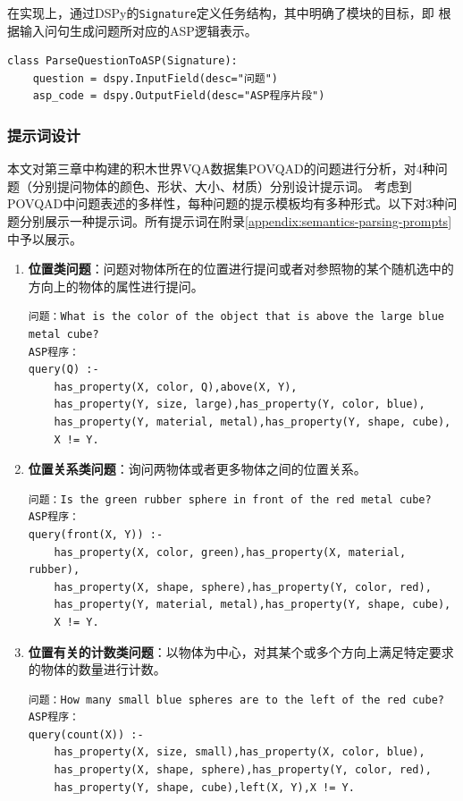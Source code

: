 在实现上，通过DSPy的\texttt{Signature}定义任务结构，其中明确了模块的目标，即
根据输入问句生成问题所对应的ASP逻辑表示。
\begin{lstlisting}
class ParseQuestionToASP(Signature):
    question = dspy.InputField(desc="问题")
    asp_code = dspy.OutputField(desc="ASP程序片段")
\end{lstlisting}
\subsubsection{提示词设计}
本文对第三章中构建的积木世界VQA数据集POVQAD的问题进行分析，对4种问题（分别提问物体的颜色、形状、大小、材质）分别设计提示词。
考虑到POVQAD中问题表述的多样性，每种问题的提示模板均有多种形式。以下对3种问题分别展示一种提示词。所有提示词在附录\ref{appendix:semantics-parsing-prompts}中予以展示。
\begin{enumerate}[nosep]
\item \textbf{位置类问题}：问题对物体所在的位置进行提问或者对参照物的某个随机选中的方向上的物体的属性进行提问。
\begin{lstlisting}
问题：What is the color of the object that is above the large blue metal cube?
ASP程序：
query(Q) :-
    has_property(X, color, Q),above(X, Y),
    has_property(Y, size, large),has_property(Y, color, blue),
    has_property(Y, material, metal),has_property(Y, shape, cube),
    X != Y.
\end{lstlisting}
\item \textbf{位置关系类问题}：询问两物体或者更多物体之间的位置关系。
\begin{lstlisting}
问题：Is the green rubber sphere in front of the red metal cube?
ASP程序：
query(front(X, Y)) :-
    has_property(X, color, green),has_property(X, material, rubber),
    has_property(X, shape, sphere),has_property(Y, color, red),
    has_property(Y, material, metal),has_property(Y, shape, cube),
    X != Y.
\end{lstlisting}
\item \textbf{位置有关的计数类问题}：以物体为中心，对其某个或多个方向上满足特定要求的物体的数量进行计数。
\begin{lstlisting}
问题：How many small blue spheres are to the left of the red cube?
ASP程序：
query(count(X)) :-
    has_property(X, size, small),has_property(X, color, blue),
    has_property(X, shape, sphere),has_property(Y, color, red),
    has_property(Y, shape, cube),left(X, Y),X != Y.
\end{lstlisting}
\end{enumerate}

